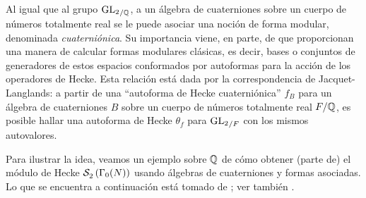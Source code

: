 Al igual que al grupo ${\mathrm{GL}_{2}}_{/\mathbb{Q}}$, a un \'{a}lgebra de cuaterniones
sobre un cuerpo de n\'{u}meros totalmente real se le puede asociar una
noci\'{o}n de forma modular, denominada \emph{cuaterni\'{o}nica}. Su
importancia viene, en parte, de que proporcionan una manera de calcular formas
modulares cl\'{a}sicas, es decir, bases o conjuntos de generadores de estos
espacios conformados por autoformas para la acci\'{o}n de los operadores de
Hecke. Esta relaci\'{o}n est\'{a} dada por la correspondencia de Jacquet-%
Langlands: a partir de una ``autoforma de Hecke cuaterni\'{o}nica'' $f_{B}$
para un \'{a}lgebra de cuaterniones $B$ sobre un cuerpo de n\'{u}meros
totalmente real $F/\mathbb{Q}$, es posible hallar una autoforma de Hecke
$\theta_{f}$ para ${\mathrm{GL}_{2}}_{/F}$ con los mismos autovalores.

Para ilustrar la idea, veamos un ejemplo sobre $\mathbb{Q}$ de c\'{o}mo obtener
(parte de) el m\'{o}dulo de Hecke $\mathcal{S}^{}_{2}\left(\Gamma_{0}(N)\right)$ usando
\'{a}lgebras de cuaterniones y formas asociadas. Lo que se encuentra a
continuaci\'{o}n est\'{a} tomado de \cite{EichlerBasisProblem}; ver tambi\'{e}n
\cite{PizerAlgo}.

